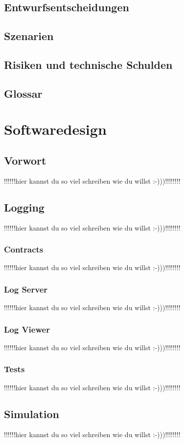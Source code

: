 \documentclass[12pt,a4paper,bibliography=totocnumbered,listof=totocnumbered]{scrartcl}
\begin{document}
\subsection{Entwurfsentscheidungen}
\subsection{Szenarien}
\subsection{Risiken und technische Schulden}
\subsection{Glossar}
\newpage
\section{Softwaredesign}
\sloppy
\subsection{Vorwort}
!!!!!!hier kannst du so viel schreiben wie du willst :-)))!!!!!!!!
\subsection{Logging}
!!!!!!hier kannst du so viel schreiben wie du willst :-)))!!!!!!!!
\subsubsection{Contracts}
!!!!!!hier kannst du so viel schreiben wie du willst :-)))!!!!!!!!
\subsubsection{Log Server}
!!!!!!hier kannst du so viel schreiben wie du willst :-)))!!!!!!!!
\subsubsection{Log Viewer}
!!!!!!hier kannst du so viel schreiben wie du willst :-)))!!!!!!!!
\subsubsection{Tests}
!!!!!!hier kannst du so viel schreiben wie du willst :-)))!!!!!!!!

\subsection{Simulation}
!!!!!!hier kannst du so viel schreiben wie du willst :-)))!!!!!!!!
\end{document}
